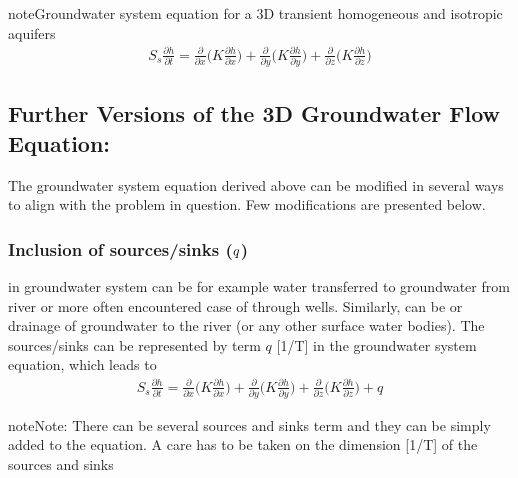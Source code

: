 \documentclass[letterpaper,10pt,english]{jupyterBook}
\begin{document}
\begin{sphinxadmonition}{note}{Groundwater system equation for a 3D transient homogeneous and isotropic aquifers }
\begin{equation*}
\begin{split}
S_s\frac{\partial h}{\partial t} = \frac{\partial }{\partial x} \bigg(K \frac{\partial h}{\partial x}\bigg) + \frac{\partial}{\partial y} \bigg(K \frac{\partial h}{\partial y}\bigg) + \frac{\partial }{\partial z}\bigg(K \frac{\partial h}{\partial z} \bigg)
\end{split}
\end{equation*}\end{sphinxadmonition}


\subsection{Further Versions of the 3D Groundwater Flow Equation:}
\label{\detokenize{content/flow/L7/17_quantify_flow:further-versions-of-the-3d-groundwater-flow-equation}}
\sphinxAtStartPar
The groundwater system equation derived above can be modified in several ways to align with the problem in question. Few modifications are presented below.


\subsubsection{Inclusion of sources/sinks (\protect\(q\protect\))}
\label{\detokenize{content/flow/L7/17_quantify_flow:inclusion-of-sources-sinks-q}}
\sphinxAtStartPar
{} in groundwater system can be for example water transferred to groundwater from river or more often encountered case of  through wells. Similarly,  can be  or drainage of groundwater to the river (or any other surface water bodies). The sources/sinks can be represented by term \(q\) {[}1/T{]} in the groundwater system equation, which leads to
\begin{equation*}
\begin{split}
S_s\frac{\partial h}{\partial t} = \frac{\partial }{\partial x} \bigg(K \frac{\partial h}{\partial x}\bigg) + \frac{\partial}{\partial y} \bigg(K \frac{\partial h}{\partial y}\bigg) + \frac{\partial }{\partial z}\bigg(K \frac{\partial h}{\partial z} \bigg) + q
\end{split}
\end{equation*}
\begin{sphinxadmonition}{note}{Note:}
\sphinxAtStartPar
There can be several sources and sinks term and they can be simply added to the equation. A care has to be taken on the dimension {[}1/T{]} of the sources and sinks
\end{sphinxadmonition}
\end{document}
